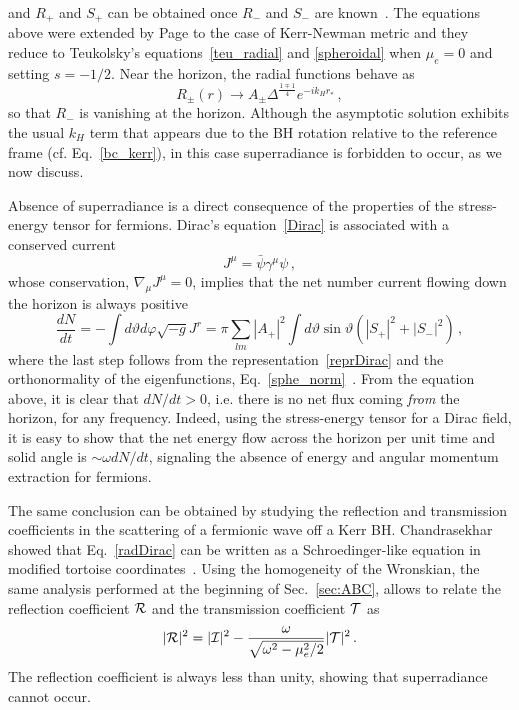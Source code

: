 \documentclass[11pt]{article}
\numberwithin{equation}{section} %
\begin{document}
and $R_{+}$ and $S_{+}$ can be obtained once $R_-$ and $S_-$ are known~\cite{Chandra:1976}. The equations above were extended by Page to the case of Kerr-Newman metric and they reduce to Teukolsky's equations~\eqref{teu_radial} and \eqref{spheroidal} when $\mu_e=0$ and setting $s=-1/2$. 
Near the horizon, the radial functions behave as
\begin{equation}
 R_{\pm}(r)\to A_{\pm}\Delta^{\frac{1\mp1}{4}}e^{-i k_H r_*}\,,
\end{equation}
so that $R_{-}$ is vanishing at the horizon. Although the asymptotic solution exhibits the usual $k_H$ term that appears due to the BH rotation relative to the reference frame (cf. Eq.~\eqref{bc_kerr}), in this case superradiance is forbidden to occur, as we now discuss.




Absence of superradiance is a direct consequence of the properties of the stress-energy tensor for fermions. Dirac's equation~\eqref{Dirac} is associated with a conserved current
%
\begin{equation}
 J^\mu=\bar\psi\gamma^\mu\psi\,,
\end{equation}
%
whose conservation, $\nabla_\mu J^\mu=0$, implies that the net number current flowing down the horizon is always positive
%
\begin{equation}
\frac{dN}{dt}=-\int d\vartheta d\varphi\sqrt{-g}J^r=\pi\sum_{lm}|A_{+}|^2\int d\vartheta \sin\vartheta(|S_{+}|^2+|S_{-}|^2)\,,
\end{equation}
%
where the last step follows from the representation~\eqref{reprDirac} and the orthonormality of the eigenfunctions, Eq.~\eqref{sphe_norm}~\cite{Iyer:1978}. From the equation above, it is clear that $dN/dt>0$, i.e. there is no net flux coming {\it from} the horizon, for any frequency. Indeed, using the stress-energy tensor for a Dirac field, it is easy to show that the net energy flow across the horizon per unit time and solid angle is $\sim\omega dN/dt$, signaling the absence of energy and angular momentum extraction for fermions. 

The same conclusion can be obtained by studying the reflection and transmission coefficients in the scattering of a fermionic wave off a Kerr BH. Chandrasekhar showed that Eq.~\eqref{radDirac} can be written as a Schroedinger-like equation in modified tortoise coordinates~\cite{Chandra}. Using the homogeneity of the Wronskian, the same analysis performed at the beginning of Sec.~\ref{sec:ABC}, allows to relate the reflection coefficient ${\cal R}$ and the transmission coefficient ${\cal T}$ as 
%
\begin{equation}
 |{\cal R}|^2=|{\cal I}|^2-\frac{\omega}{\sqrt{\omega^2-\mu_e^2/2}}|{\cal T}|^2\,.
\end{equation}
%
The reflection coefficient is always less than unity, showing that superradiance cannot occur.
\end{document}
